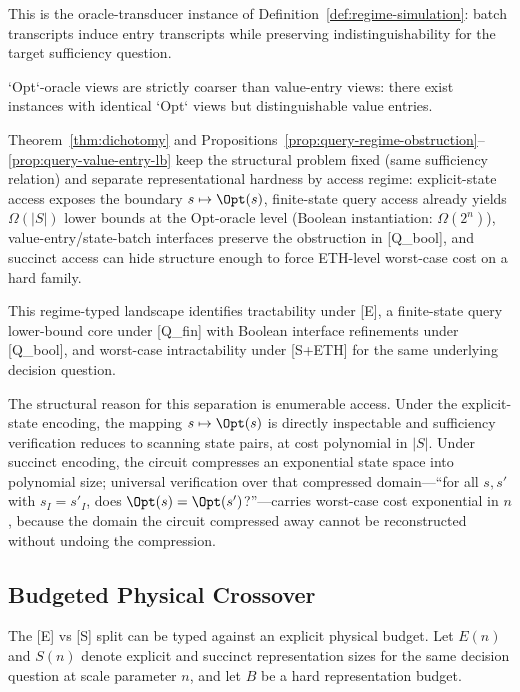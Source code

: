 This is the oracle-transducer instance of Definition~\ref{def:regime-simulation}: batch transcripts induce entry transcripts while preserving indistinguishability for the target sufficiency question.

\begin{proposition}\label{prop:oracle-lattice-strict}
`Opt`-oracle views are strictly coarser than value-entry views: there exist instances with identical `Opt` views but distinguishable value entries.
\end{proposition}

\begin{remark}
Theorem~\ref{thm:dichotomy} and Propositions~\ref{prop:query-regime-obstruction}--\ref{prop:query-value-entry-lb} keep the structural problem fixed (same sufficiency relation) and separate representational hardness by access regime: explicit-state access exposes the boundary $s \mapsto \Opt(s)$, finite-state query access already yields $\Omega(|S|)$ lower bounds at the Opt-oracle level (Boolean instantiation: $\Omega(2^n)$), value-entry/state-batch interfaces preserve the obstruction in [Q\_bool], and succinct access can hide structure enough to force ETH-level worst-case cost on a hard family.
\end{remark}

This regime-typed landscape identifies tractability under [E], a finite-state query lower-bound core under [Q\_fin] with Boolean interface refinements under [Q\_bool], and worst-case intractability under [S+ETH] for the same underlying decision question.

The structural reason for this separation is enumerable access. Under the explicit-state encoding, the mapping $s \mapsto \Opt(s)$ is directly inspectable and sufficiency verification reduces to scanning state pairs, at cost polynomial in $|S|$. Under succinct encoding, the circuit compresses an exponential state space into polynomial size; universal verification over that compressed domain---``for all $s, s'$ with $s_I = s'_I$, does $\Opt(s) = \Opt(s')$?''---carries worst-case cost exponential in $n$, because the domain the circuit compressed away cannot be reconstructed without undoing the compression.

\subsection{Budgeted Physical Crossover}
The [E] vs [S] split can be typed against an explicit physical budget. Let $E(n)$ and $S(n)$ denote explicit and succinct representation sizes for the same decision question at scale parameter $n$, and let $B$ be a hard representation budget.

